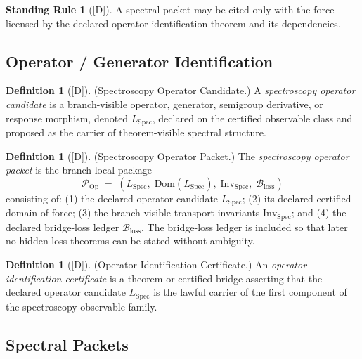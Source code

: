 \documentclass[12pt,oneside]{amsbook}
\theoremstyle{plain}
\theoremstyle{definition}
\newtheorem{definition}[theorem]{Definition}
\newtheorem{standingrule}[theorem]{Standing Rule}
\theoremstyle{remark}
\newcommand{\status}[1]{\textup{[#1]}}
\begin{document}
\begin{standingrule}[\status{D}]\label{sr:spec-packet-force}
A spectral packet may be cited only with the force licensed by the declared
operator-identification theorem and its dependencies.
\end{standingrule}

\subsection{Operator / Generator Identification}\label{sec:spec-op-id}

\begin{definition}[\status{D}]\label{def:spec-operator-candidate}
\textup{(Spectroscopy Operator Candidate.)}
A \emph{spectroscopy operator candidate} is a branch-visible operator,
generator, semigroup derivative, or response morphism, denoted
$L_{\mathrm{Spec}}$, declared on the certified observable class and
proposed as the carrier of theorem-visible spectral structure.
\end{definition}

\begin{definition}[\status{D}]\label{def:spec-operator-packet}
\textup{(Spectroscopy Operator Packet.)}
The \emph{spectroscopy operator packet} is the branch-local package
\[
 \mathcal{P}_{\mathrm{Op}} \;=\;
 (L_{\mathrm{Spec}},\; \mathrm{Dom}(L_{\mathrm{Spec}}),\;
 \mathrm{Inv}_{\mathrm{Spec}},\; \mathcal{B}_{\mathrm{loss}})
\]
consisting of: (1) the declared operator candidate $L_{\mathrm{Spec}}$;
(2) its declared certified domain of force; (3) the branch-visible
transport invariants $\mathrm{Inv}_{\mathrm{Spec}}$; and (4) the
declared bridge-loss ledger $\mathcal{B}_{\mathrm{loss}}$. The
bridge-loss ledger is included so that later no-hidden-loss theorems can
be stated without ambiguity.
\end{definition}

\begin{definition}[\status{D}]\label{def:operator-id-certificate}
\textup{(Operator Identification Certificate.)}
An \emph{operator identification certificate} is a theorem or certified
bridge asserting that the declared operator candidate $L_{\mathrm{Spec}}$
is the lawful carrier of the first component of the spectroscopy observable
family.
\end{definition}

\subsection{Spectral Packets}\label{sec:spec-packets}
\end{document}

